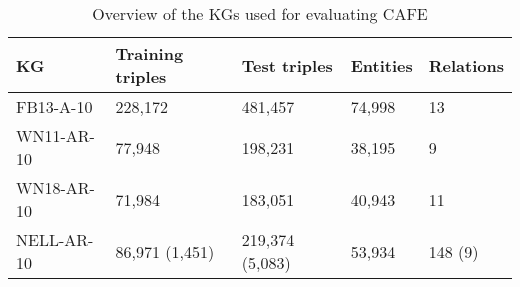 \begin{table}
    \begin{center}
    \begin{tabular}{ >{\raggedright\arraybackslash}M{3.5cm} | M{2.5cm} | M{2.5cm} | M{1.75cm} | M{1.75cm} }
    \centering \textbf{KG} & \textbf{Training triples} & \textbf{Test triples} & \textbf{Entities} & \textbf{Relations} \\
    \hline
    FB13-A-10 & 228,172 & 481,457 & 74,998 & 13 \\ 
    \hline
    WN11-AR-10 & 77,948 & 198,231 & 38,195 & 9 \\
    \hline 
    WN18-AR-10 & 71,984 & 183,051 & 40,943 & 11 \\
    \hline 
    NELL-AR-10 & 86,971 (1,451) & 219,374 (5,083) & 53,934 & 148 (9) \\
    \end{tabular}
    \caption{Overview of the KGs used for evaluating CAFE}
    \label{table:cafe-datasets}
    \end{center}
\end{table}